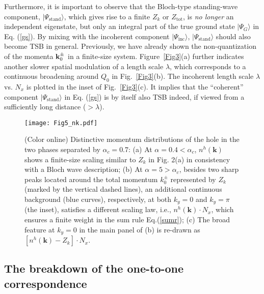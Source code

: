\documentclass[aps,prb,twocolumn,notitlepage,superscriptaddress,showpacs]{revtex4-1}
\begin{document}
Furthermore, it is important to observe that the Bloch-type standing-wave component, $|\Psi_{\mathrm {stand}}\rangle$, which gives rise to a finite $Z_k$ or $Z_{\mathrm {tot}}$, is \emph{no longer} an independent eigenstate, but only an integral part of the true ground state $|\Psi_G \rangle$ in Eq. (\ref{gs}). By mixing with the incoherent component $|\Psi_{\mathrm {inc}}\rangle $, $|\Psi_{\mathrm {stand}}\rangle$ should also become TSB in general. Previously, we have already shown the non-quantization of the momenta ${\textbf k}^{\pm}_0$ in a finite-size system. Figure~\ref{Fig3}(a) further indicates another slower spatial modulation of a length scale $\lambda$, which corresponds to a continuous broadening around $Q_0$ in Fig.~\ref{Fig3}(b). The incoherent length scale $\lambda$ vs. $N_x$ is plotted in the inset of Fig.~\ref{Fig3}(c).
It implies that the ``coherent'' component $|\Psi_{\mathrm {stand}}\rangle$ in Eq. (\ref{gs}) is by itself also TSB indeed, if viewed from a sufficiently long distance ($>\lambda$).



\begin{figure}[tbp]
\begin{center}
\texttt{[image: Fig5\_nk.pdf]}
\end{center}
\par
\renewcommand{\figurename}{Fig}
\caption{(Color online) Distinctive momentum distributions of the hole in the two phases separated by $\alpha_c=0.7$: (a) At $\alpha=0.4<\alpha_c$, $n^h({ \textbf{k}})$ shows a finite-size scaling similar to $Z_k$ in Fig. 2(a) in consistency with a Bloch wave description;
(b) At $\alpha=5>\alpha_c$, besides two sharp peaks located around the total momentum $k^{\pm}_0$ represented by $Z_k$ (marked by the vertical dashed lines), an additional continuous background (blue curves), respectively, at both $k_y=0$ and $k_y=\pi$ (the inset), satisfies a different scaling law, i.e., $n^h({ \textbf{k}})\cdot N_x $, which ensures a finite weight in the sum rule Eq.(\ref{sumr}); (c) The broad feature at $k_y=0$ in the main panel of (b) is re-drawn as $[n^h({ \textbf{k}})-Z_k]\cdot N_x $. }
\label{Fig:nk}
\end{figure}




\subsection{The breakdown of the one-to-one correspondence}
\end{document}
